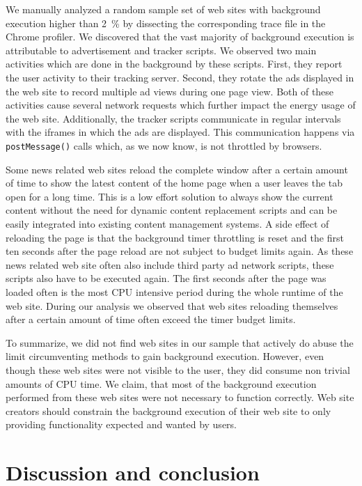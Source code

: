 \documentclass[
	ruledheaders=section,%
	class=report,%
	thesis={type=bachelor},%
	accentcolor=9c,%
	custommargins=true,%
	marginpar=false,%
	parskip=half-,%
	fontsize=11pt,%
]{tudapub}
\begin{document}
  We manually analyzed a random sample set of web sites with background execution higher than 2~\% by dissecting the corresponding trace file in the Chrome profiler. We discovered that the vast majority of background execution is attributable to advertisement and tracker scripts. We observed two main activities which are done in the background by these scripts. First, they report the user activity to their tracking server. Second, they rotate the ads displayed in the web site to record multiple ad views during one page view. Both of these activities cause several network requests which further impact the energy usage of the web site. Additionally, the tracker scripts communicate in regular intervals with the iframes in which the ads are displayed. This communication happens via \texttt{postMessage()} calls which, as we now know, is not throttled by browsers.
  
  Some news related web sites reload the complete window after a certain amount of time to show the latest content of the home page when a user leaves the tab open for a long time. This is a low effort solution to always show the current content without the need for dynamic content replacement scripts and can be easily integrated into existing content management systems. A side effect of reloading the page is that the background timer throttling is reset and the first ten seconds after the page reload are not subject to budget limits again. As these news related web site often also include third party ad network scripts, these scripts also have to be executed again. The first seconds after the page was loaded often is the most CPU intensive period during the whole runtime of the web site. During our analysis we observed that web sites reloading themselves after a certain amount of time often exceed the timer budget limits.
  
  To summarize, we did not find web sites in our sample that actively do abuse the limit circumventing methods to gain background execution. However, even though these web sites were not visible to the user, they did consume non trivial amounts of CPU time. We claim, that most of the background execution performed from these web sites were not necessary to function correctly. Web site creators should constrain the background execution of their web site to only providing functionality expected and wanted by users.

  
  \newpage
  \chapter{Discussion and conclusion}
\end{document}
